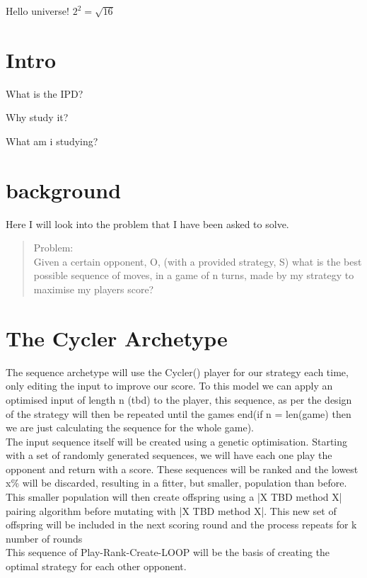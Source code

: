 \documentclass{report}
\begin{document}
    
    

    \tableofcontents
    \listoffigures
	
	\newpage

Hello universe! 
$2^2 = \sqrt{16}$

\section{Intro}

What is the IPD? 

Why study it?

What am i studying?

\section{background}
Here I will look into the problem that I have been asked to solve.

\begin{quotation}
    Problem:\\
    Given a certain opponent, O, (with a provided strategy, S) what is the best possible sequence of moves, in a game of n turns, made by my strategy to maximise my players score?
\end{quotation}

\section{The Cycler Archetype}

The sequence archetype will use the Cycler() player for our strategy each time, only editing the input to improve our score. To this model we can apply an optimised input of length n (tbd) to the player, this sequence, as per the design of the strategy will then be repeated until the games end(if n = len(game) then we are just calculating the sequence for the whole game).\\

The input sequence itself will be created using a genetic optimisation. Starting with a set of randomly generated sequences, we will have each one play the opponent and return with a score. These sequences will be ranked and the lowest x\% will be discarded, resulting in a fitter, but smaller, population than before. This smaller population will then create offspring using a |X TBD method X| pairing algorithm before mutating with |X TBD method X|. This new set of offspring will be included in the next scoring round and the process repeats for k number of rounds\\

This sequence of Play-Rank-Create-LOOP will be the basis of creating the optimal strategy for each other opponent.
\end{document}
